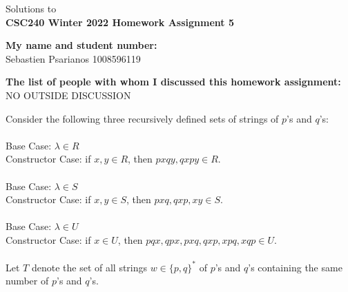 \documentclass[11pt]{article}
\begin{document}
\begin{center}
Solutions to\\
{\bf \Large \bf CSC240 Winter 2022 Homework Assignment 5}
\end{center}

\noindent
{\bf My name and student number:}\\
Sebastien Psarianos 1008596119
\medskip

\noindent
{\bf The list of people with whom I discussed this homework assignment:}\\
NO OUTSIDE DISCUSSION

\begin{question}
Consider the following three recursively defined sets of strings of $p$'s and $q$'s:\\
 \\
Base Case: $\lambda \in R$\\
Constructor Case: if $x,y \in R$, then $pxqy, qxpy \in R$.\\
 \\
Base Case: $\lambda \in S$\\
Constructor Case: if $x,y \in S$, then $pxq, qxp, xy \in S$.\\
 \\
Base Case: $\lambda \in U$\\
Constructor Case: if $x \in U$, then $pqx, qpx, pxq, qxp, xpq, xqp \in U$.\\
 \\
Let $T$ denote the set of all strings $w \in \{p,q\}^*$ of $p$'s and $q$'s containing the same number
of $p$'s and $q$'s.
\end{question}
\end{document}
